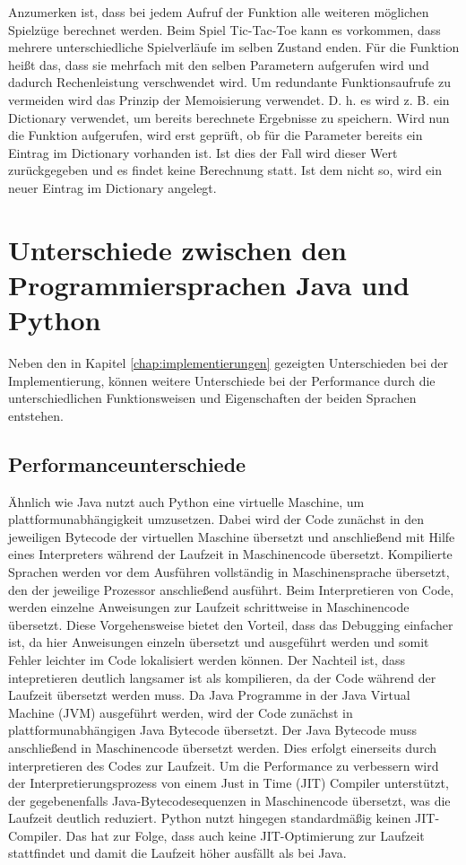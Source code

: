 Anzumerken ist, dass bei jedem Aufruf der Funktion  alle weiteren möglichen Spielzüge berechnet werden. 
Beim Spiel Tic-Tac-Toe kann es vorkommen, dass mehrere unterschiedliche Spielverläufe im selben Zustand enden. 
Für die Funktion  heißt das, dass sie mehrfach mit den selben Parametern aufgerufen wird und dadurch 
Rechenleistung verschwendet wird. Um redundante Funktionsaufrufe zu vermeiden wird das Prinzip der Memoisierung 
verwendet. D. h. es wird z. B. ein Dictionary verwendet, um bereits berechnete Ergebnisse zu speichern. Wird nun 
die Funktion  aufgerufen, wird erst geprüft, ob für die Parameter bereits ein Eintrag im Dictionary 
vorhanden ist. Ist dies der Fall wird dieser Wert zurückgegeben und es findet keine Berechnung statt. Ist dem nicht 
so, wird ein neuer Eintrag im Dictionary angelegt.

\section{Unterschiede zwischen den Programmiersprachen Java und Python}
Neben den in Kapitel \ref{chap:implementierungen} gezeigten Unterschieden bei der Implementierung, können weitere Unterschiede 
bei der Performance durch die unterschiedlichen Funktionsweisen und Eigenschaften der beiden Sprachen entstehen.

\subsection{Performanceunterschiede}
Ähnlich wie Java nutzt auch Python eine virtuelle Maschine, um plattformunabhängigkeit umzusetzen. Dabei wird der Code 
zunächst in den jeweiligen Bytecode der virtuellen Maschine übersetzt und anschließend mit Hilfe eines Interpreters während 
der Laufzeit in Maschinencode übersetzt. Kompilierte Sprachen werden vor dem Ausführen vollständig in Maschinensprache übersetzt, den der 
jeweilige Prozessor anschließend ausführt. Beim Interpretieren von Code, werden einzelne Anweisungen zur Laufzeit schrittweise 
in Maschinencode übersetzt. Diese Vorgehensweise bietet den Vorteil, dass das Debugging einfacher ist, da hier Anweisungen 
einzeln übersetzt und ausgeführt werden und somit Fehler leichter im Code lokalisiert werden können. Der Nachteil ist, dass 
intepretieren deutlich langsamer ist als kompilieren, da der Code während der Laufzeit übersetzt werden muss. Da Java Programme 
in der Java Virtual Machine (JVM) ausgeführt werden, wird der Code zunächst in plattformunabhängigen Java Bytecode übersetzt. 
Der Java Bytecode muss anschließend in Maschinencode übersetzt werden. Dies erfolgt einerseits durch interpretieren des Codes 
zur Laufzeit. Um die Performance zu verbessern wird der Interpretierungsprozess von einem Just in Time (JIT) Compiler unterstützt, 
der gegebenenfalls Java-Bytecodesequenzen in Maschinencode übersetzt, was die Laufzeit deutlich reduziert.\autocite[Vgl.][]{Aboullaite.31.8.2017}
Python nutzt hingegen standardmäßig keinen JIT-Compiler. Das hat zur Folge, dass auch keine JIT-Optimierung zur Laufzeit stattfindet 
und damit die Laufzeit höher ausfällt als bei Java.\autocite[Vgl.][]{Shaw.16.7.2018}

